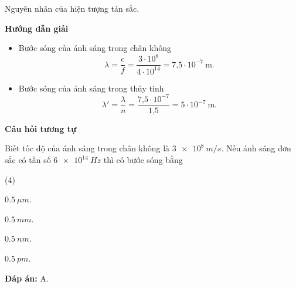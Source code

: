 \begin{dang}{Nguyên nhân của hiện tượng tán sắc.}
	{	\begin{center}
			\textbf{Hướng dẫn giải}
		\end{center}
		
		\begin{itemize}
			\item Bước sóng của ánh sáng trong chân không
			\begin{equation*}
				\lambda =\dfrac{c}{f}=\dfrac{3\cdot 10^8}{4\cdot 10^{14}}=\text{7,5}\cdot 10^{-7}\ \text{m}.
			\end{equation*}
			\item Bước sóng của ánh sáng trong thủy tinh
			\begin{equation*}
				\lambda' =\dfrac{\lambda}{n}=\dfrac{\text{7,5}\cdot 10^{-7}}{\text{1,5}}= 5 \cdot 10^{-7}\ \text{m}.
			\end{equation*}
		\end{itemize}
		
		\begin{center}
			\textbf{Câu hỏi tương tự}
		\end{center}
		
		Biết tốc độ của ánh sáng trong chân không là $ \SI{3e8}{m/s} $. Nếu ánh sáng đơn sắc có tần số $ \SI{6 e14}{Hz} $ thì có bước sóng bằng
		\begin{mcq}(4)
			\item $ \SI{0,5}{\mu m} $.
			\item $ \SI{0,5}{mm} $.
			\item $ \SI{0,5}{nm} $.
			\item $ \SI{0,5}{pm} $.
		\end{mcq}
		
		
		\textbf{Đáp án:} A.
	}
\end{dang}

